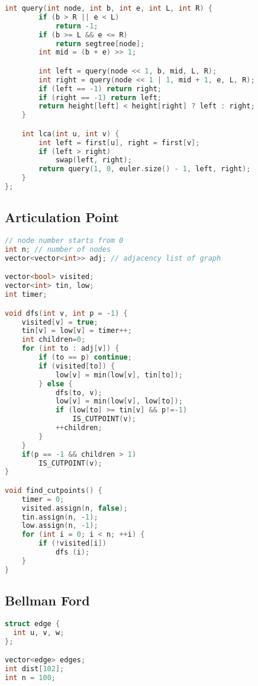 \documentclass[10pt,a4paper,landscape]{article}
\begin{document}
\begin{multicols}{3}
\begin{lstlisting}[language=C++,breaklines=true]
    int query(int node, int b, int e, int L, int R) {
        if (b > R || e < L)
            return -1;
        if (b >= L && e <= R)
            return segtree[node];
        int mid = (b + e) >> 1;

        int left = query(node << 1, b, mid, L, R);
        int right = query(node << 1 | 1, mid + 1, e, L, R);
        if (left == -1) return right;
        if (right == -1) return left;
        return height[left] < height[right] ? left : right;
    }

    int lca(int u, int v) {
        int left = first[u], right = first[v];
        if (left > right)
            swap(left, right);
        return query(1, 0, euler.size() - 1, left, right);
    }
};
\end{lstlisting}

\subsection{Articulation Point}
\begin{lstlisting}[language=C++, breaklines=true]
// node number starts from 0
int n; // number of nodes
vector<vector<int>> adj; // adjacency list of graph

vector<bool> visited;
vector<int> tin, low;
int timer;

void dfs(int v, int p = -1) {
    visited[v] = true;
    tin[v] = low[v] = timer++;
    int children=0;
    for (int to : adj[v]) {
        if (to == p) continue;
        if (visited[to]) {
            low[v] = min(low[v], tin[to]);
        } else {
            dfs(to, v);
            low[v] = min(low[v], low[to]);
            if (low[to] >= tin[v] && p!=-1)
                IS_CUTPOINT(v);
            ++children;
        }
    }
    if(p == -1 && children > 1)
        IS_CUTPOINT(v);
}

void find_cutpoints() {
    timer = 0;
    visited.assign(n, false);
    tin.assign(n, -1);
    low.assign(n, -1);
    for (int i = 0; i < n; ++i) {
        if (!visited[i])
            dfs (i);
    }
}
\end{lstlisting}

\subsection{Bellman Ford}
\begin{lstlisting}[language=C++, breaklines=true]
struct edge {
  int u, v, w;
};

vector<edge> edges;
int dist[102];
int n = 100;


\end{lstlisting}
\end{multicols}
\end{document}

